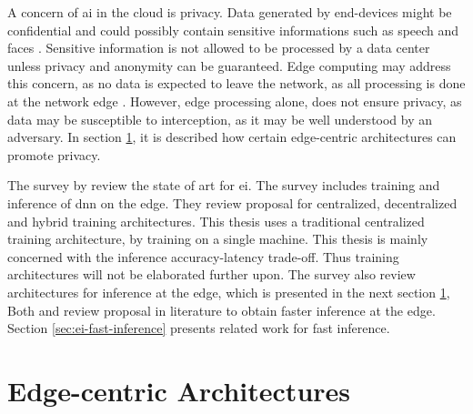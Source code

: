 A concern of \gls{ai} in the cloud is privacy. Data generated by end-devices might be confidential and could possibly contain sensitive informations such as speech and faces \cite{chen_deep_2019}. Sensitive information is not allowed to be processed by a data center unless privacy and anonymity can be guaranteed. Edge computing may address this concern, as no data is expected to leave the network, as all processing is done at the network edge \cite{chen_deep_2019}. However, edge processing alone, does not ensure privacy, as data may be susceptible to interception, as it may be well understood by an adversary. In section \ref{sec:ei-architecture}, it is described how certain edge-centric architectures can promote privacy. 
 
The survey  by \citet{zhou_edge_2019} review the state of art for \gls{ei}. The survey includes training and inference of \gls{dnn} on the edge. They review proposal for centralized, decentralized and hybrid training architectures. This thesis uses a traditional centralized training architecture, by training on a single machine. This thesis is mainly concerned with the inference accuracy-latency trade-off. Thus training architectures will not be elaborated further upon. The survey also review architectures for inference at the edge, which is presented in the next section \ref{sec:ei-architecture},  Both \cite{zhou_edge_2019} and \cite{chen_deep_2019} review proposal in literature to obtain faster inference at the edge. Section \ref{sec:ei-fast-inference} presents related work for fast inference. 

\newpage
\section{Edge-centric Architectures} \label{sec:ei-architecture}

